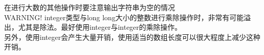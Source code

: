 在进行大数的其他操作时要注意输出字符串为空的情况 \\
WARNING! integer类型与long long大小的整数进行乘除操作时，非常有可能溢出，尤其是除法。最好使用integer与integer的乘除操作。\\
另外，使用integer会产生大量开销，使用适当的数组长度可以很大程度上减少这种开销。
